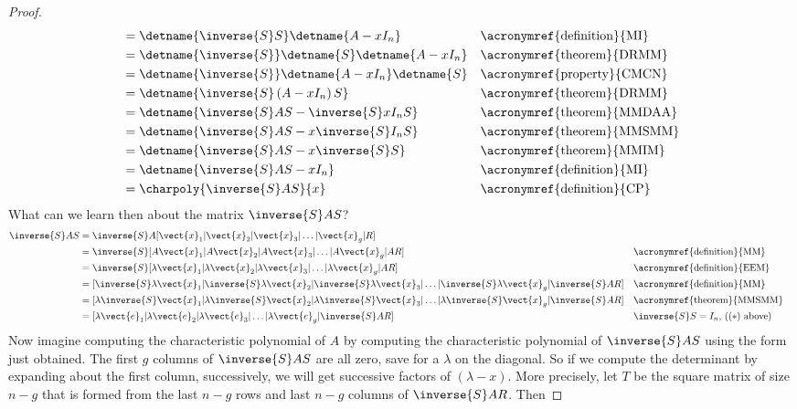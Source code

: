 \begin{proof}
\begin{align*}
&=\detname{\inverse{S}S}\detname{A-xI_n}&&\text{\acronymref{definition}{MI}}\\
&=\detname{\inverse{S}}\detname{S}\detname{A-xI_n}&&\text{\acronymref{theorem}{DRMM}}\\
&=\detname{\inverse{S}}\detname{A-xI_n}\detname{S}&&\text{\acronymref{property}{CMCN}}\\
&=\detname{\inverse{S}\left(A-xI_n\right)S}&&\text{\acronymref{theorem}{DRMM}}\\
&=\detname{\inverse{S}AS-\inverse{S}xI_nS}&&\text{\acronymref{theorem}{MMDAA}}\\
&=\detname{\inverse{S}AS-x\inverse{S}I_nS}&&\text{\acronymref{theorem}{MMSMM}}\\
&=\detname{\inverse{S}AS-x\inverse{S}S}&&\text{\acronymref{theorem}{MMIM}}\\
&=\detname{\inverse{S}AS-xI_n}&&\text{\acronymref{definition}{MI}}\\
&=\charpoly{\inverse{S}AS}{x}&&\text{\acronymref{definition}{CP}}
\end{align*}
%
What can we learn then about the matrix $\inverse{S}AS$?
%
\begin{align*}
\inverse{S}AS&=\inverse{S}A[\vect{x}_1|\vect{x}_2|\vect{x}_3|\ldots|\vect{x}_g|R]\\
&=\inverse{S}[A\vect{x}_1|A\vect{x}_2|A\vect{x}_3|\ldots|A\vect{x}_g|AR]&&\text{\acronymref{definition}{MM}}\\
&=\inverse{S}[\lambda\vect{x}_1|\lambda\vect{x}_2|\lambda\vect{x}_3|\ldots|\lambda\vect{x}_g|AR]&&\text{\acronymref{definition}{EEM}}\\
&=[\inverse{S}\lambda\vect{x}_1|\inverse{S}\lambda\vect{x}_2|\inverse{S}\lambda\vect{x}_3|\ldots|\inverse{S}\lambda\vect{x}_g|\inverse{S}AR]&&\text{\acronymref{definition}{MM}}\\
&=[\lambda\inverse{S}\vect{x}_1|\lambda\inverse{S}\vect{x}_2|\lambda\inverse{S}\vect{x}_3|\ldots|\lambda\inverse{S}\vect{x}_g|\inverse{S}AR]&&\text{\acronymref{theorem}{MMSMM}}\\
&=[\lambda\vect{e}_1|\lambda\vect{e}_2|\lambda\vect{e}_3|\ldots|\lambda\vect{e}_g|\inverse{S}AR]&&\text{$\inverse{S}S=I_n$, (($*$) above)}
\end{align*}
%
Now imagine computing the characteristic polynomial of $A$ by computing the characteristic polynomial of $\inverse{S}AS$ using the form just obtained.  The first $g$ columns of $\inverse{S}AS$ are all zero, save for a $\lambda$ on the diagonal.  So if we compute the determinant by expanding about the first column, successively, we will get successive factors of $(\lambda-x)$.  More precisely, let $T$ be the square matrix of size $n-g$ that is formed from the last $n-g$ rows and last $n-g$ columns of $\inverse{S}AR$.  Then

\end{proof}
